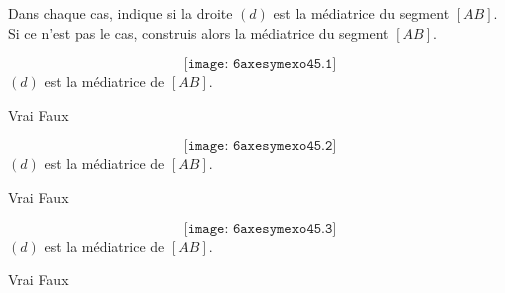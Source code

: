 Dans chaque cas, indique si la droite $(d)$ est la médiatrice du
segment $[AB]$. Si ce n'est pas le cas, construis alors la médiatrice
du segment $[AB]$.
\begin{multicols}{3}
  \[\texttt{[image: 6axesymexo45.1]}\]
  $(d)$ est la médiatrice de $[AB]$.
  \centerline{Vrai \linewidth Faux }
  \par\columnbreak\par
  \[\texttt{[image: 6axesymexo45.2]}\]
  $(d)$ est la médiatrice de $[AB]$.
  \centerline{Vrai \linewidth Faux }
  \par\columnbreak\par
  \[\texttt{[image: 6axesymexo45.3]}\]
  $(d)$ est la médiatrice de $[AB]$.
  \centerline{Vrai \linewidth Faux }
\end{multicols}